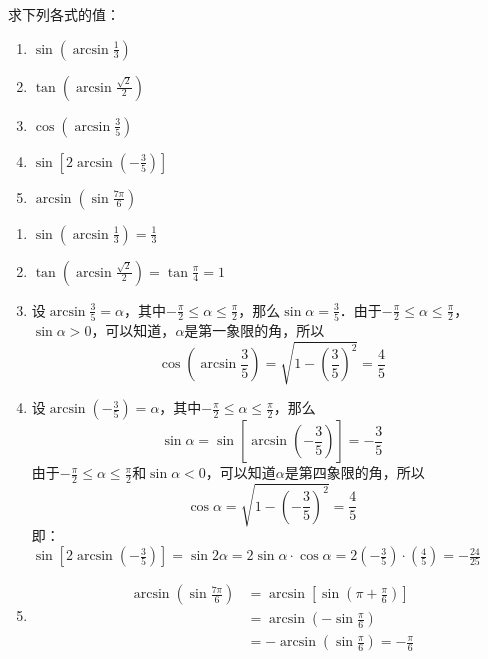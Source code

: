 \begin{example}
    求下列各式的值：
\begin{multicols}{2}
\begin{enumerate}
    \item $\sin\left(\arcsin\frac{1}{3}\right)$
    \item $\tan\left(\arcsin\frac{\sqrt{2}}{2}\right)$
    \item $\cos\left(\arcsin\frac{3}{5}\right)$
    \item $\sin\left[2\arcsin\left(-\frac{3}{5}\right)\right]$
    \item $\arcsin\left(\sin\frac{7\pi}{6}\right)$
\end{enumerate}
\end{multicols}
\end{example}

\begin{solution}
\begin{enumerate}
    \item $\sin\left(\arcsin\frac{1}{3}\right)=\frac{1}{3}$
    \item $\tan\left(\arcsin\frac{\sqrt{2}}{2}\right)=\tan\frac{\pi}{4}=1$
    \item 设$\arcsin\frac{3}{5}=\alpha$，其中$-\frac{\pi}{2}\le\alpha\le\frac{\pi}{2}$，那么$\sin\alpha=\frac{3}{5}$．由于$-\frac{\pi}{2}\le\alpha\le\frac{\pi}{2}$，$\sin\alpha>0$，可以知道，$\alpha$是第一象限的角，所以
    $$\cos\left(\arcsin\frac{3}{5}\right)=\sqrt{1-\left(\frac{3}{5}\right)^2}=\frac{4}{5}$$
    \item 设$\arcsin\left(-\frac{3}{5}\right)=\alpha$，其中$-\frac{\pi}{2}\le\alpha\le\frac{\pi}{2}$，那么
    \[\sin\alpha =\sin\left[\arcsin\left(-\frac{3}{5}\right)\right]=-\frac{3}{5}\]
由于$-\frac{\pi}{2}\le\alpha\le\frac{\pi}{2}$和$\sin\alpha<0$，可以知道$\alpha$是第四象限的角，所以
\[\cos\alpha=\sqrt{1-\left(-\frac{3}{5}\right)^2}=\frac{4}{5}\]
即：
$\sin\left[2\arcsin\left(-\frac{3}{5}\right)\right]=\sin2\alpha=2\sin\alpha\cdot \cos\alpha=2\left(-\frac{3}{5}\right)\cdot\left(\frac{4}{5}\right)=-\frac{24}{25}$
    \item \[\begin{split}
\arcsin\left(\sin\frac{7\pi}{6}\right)&=\arcsin\left[\sin\left(\pi+\frac{\pi}{6}\right)\right]\\
&=\arcsin\left(-\sin\frac{\pi}{6}\right)\\
&=-\arcsin\left(\sin\frac{\pi}{6}\right)=-\frac{\pi}{6}        
    \end{split}\]
\end{enumerate}
\end{solution}

